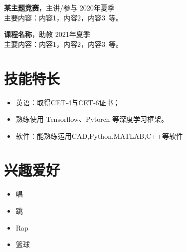 \vspace{1em}
{\large{\textbf{某主题竞赛}}}，主讲/参与 \hfill {2020年夏季}\\
主要内容：内容1，内容2，内容3\ 等。

\vspace{1em}
{\large{\textbf{课程名称}}}，助教 \hfill {2021年夏季}\\
主要内容：内容1，内容2，内容3\ 等。


\begin{minipage}[t]{0.6\textwidth}
    \section[技能特长]{\makebox[\widthof{\faWrench}][c]{\color{FOSU_Red}{\faWrench}}\quad 技能特长}
    \begin{itemize}
    \setlength{\itemsep}{0.5em}
        \item 英语：取得CET‑4与CET‑6证书；
        \item 熟练使用 Tensorflow、Pytorch 等深度学习框架。
        \item 软件：能熟练运用CAD,Python,MATLAB,C++等软件
    \end{itemize}
\end{minipage}
\hfill
\begin{minipage}[t]{0.35\textwidth}
    \section[兴趣爱好]{\makebox[\widthof{\faWrench}][c]{\color{FOSU_Red}{\faStar}}\quad 兴趣爱好}
    \begin{itemize}
    \setlength{\itemsep}{0.5em}
        \item 唱
        \item 跳
        \item Rap
        \item 篮球
    \end{itemize}
\end{minipage}
  



